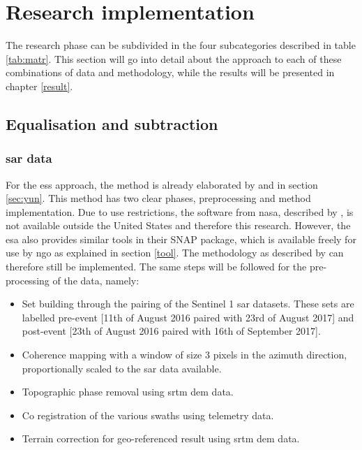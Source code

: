 \section{Research implementation} \label{sec:res}
\noindent The research phase can be subdivided in the four subcategories described in table \ref{tab:matr}. This section will go into detail about the approach to each of these combinations of data and methodology, while the results will be presented in chapter \ref{result}.

\subsection{Equalisation and subtraction}\label{sec:Myun}
\subsubsection*{\ac{sar} data}
For the \ac{ess} approach, the method is already elaborated by \citet{Yun2015} and in section \ref{sec:yun}. This method has two clear phases, preprocessing and method implementation. Due to use restrictions, the software from \ac{nasa}, described by \citet{Yun2015}, is not available outside the United States and therefore this research. However, the \ac{esa} also provides similar tools in their SNAP package, which is available freely for use by \ac{ngo} as explained in section \ref{tool}. The methodology as described by \citet{Yun2015} can therefore still be implemented. The same steps will be followed for the pre-processing of the data, namely:

\begin{itemize}
	\item Set building through the pairing of the Sentinel 1 \ac{sar} datasets. These sets are labelled pre-event [11th of August 2016 paired with 23rd of August 2017] and post-event [23th of August 2016 paired with 16th of September 2017].
	\item Coherence mapping with a window of size 3 pixels in the azimuth direction, proportionally scaled to the \ac{sar} data available.
	\item Topographic phase removal using \ac{srtm} \ac{dem} data.
	\item Co registration of the various swaths using telemetry data.
	\item Terrain correction for geo-referenced result using  \ac{srtm} \ac{dem} data. \\
\end{itemize} 

